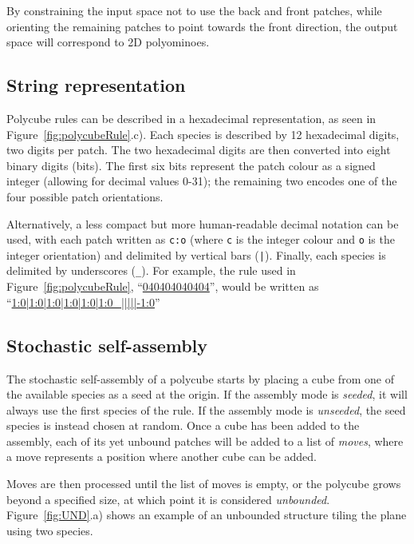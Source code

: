 By constraining the input space not to use the back and front patches, while orienting the remaining patches to point towards the front direction, the output space will correspond to 2D polyominoes.

\subsection{String representation}
\label{sec:string_repr}

Polycube rules can be described in a hexadecimal representation, as seen in Figure~\ref{fig:polycubeRule}.c). Each species is described by 12 hexadecimal digits, two digits per patch. The two hexadecimal digits are then converted into eight binary digits (bits). The first six bits represent the patch colour as a signed integer (allowing for decimal values 0-31); the remaining two encodes one of the four possible patch orientations.

Alternatively, a less compact but more human-readable decimal notation can be used, with each patch written as \texttt{c:o} (where \texttt{c} is the integer colour and \texttt{o} is the integer orientation) and delimited by vertical bars (\texttt{|}). Finally, each species is delimited by underscores (\texttt{\_}). For example, the rule used in Figure~\ref{fig:polycubeRule}, ``\href{https://akodiat.github.io/polycubes?rule=040404040404000000000084}{040404040404}'', would be written as ``\href{https://akodiat.github.io/polycubes?decRule=1:0|1:0|1:0|1:0|1:0|1:0_|||||-1:0}{1:0|1:0|1:0|1:0|1:0|1:0\_|||||-1:0}''

\subsection{Stochastic self-assembly}
\label{sec:stochastic_assembly}

The stochastic self-assembly of a polycube starts by placing a cube from one of the available species as a seed at the origin. If the assembly mode is \emph{seeded}, it will always use the first species of the rule. If the assembly mode is \emph{unseeded}, the seed species is instead chosen at random. Once a cube has been added to the assembly, each of its yet unbound patches will be added to a list of \emph{moves}, where a move represents a position where another cube can be added.

Moves are then processed until the list of moves is empty, or the polycube grows beyond a specified size, at which point it is considered \emph{unbounded}. Figure~\ref{fig:UND}.a) shows an example of an unbounded structure tiling the plane using two species.

